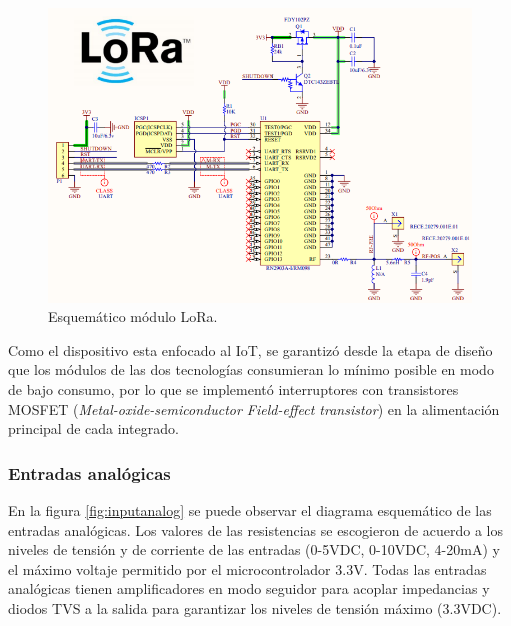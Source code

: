 \begin{figure}[h]
	\centering
	\includegraphics[scale=.55]{./Figures/lORA_SCH.PNG}
	\caption{Esquemático módulo LoRa.}
	\label{fig:lORA_SCH}
\end{figure}

Como el dispositivo esta enfocado al IoT, se garantizó desde la etapa de diseño que los módulos de las dos tecnologías consumieran lo mínimo posible en modo de bajo consumo, por lo que se implementó interruptores con transistores MOSFET (\textit{Metal-oxide-semiconductor Field-effect transistor}) en la alimentación principal de cada integrado.

\subsubsection{Entradas analógicas}

En la figura \ref{fig:inputanalog} se puede observar el diagrama esquemático de las entradas analógicas. Los valores de las resistencias se escogieron de acuerdo a los niveles de tensión y de corriente de las entradas (0-5VDC, 0-10VDC, 4-20mA) y el máximo voltaje permitido por el microcontrolador 3.3V. Todas las entradas analógicas tienen amplificadores en modo seguidor para acoplar impedancias y diodos TVS a la salida para garantizar los niveles de tensión máximo (3.3VDC).


